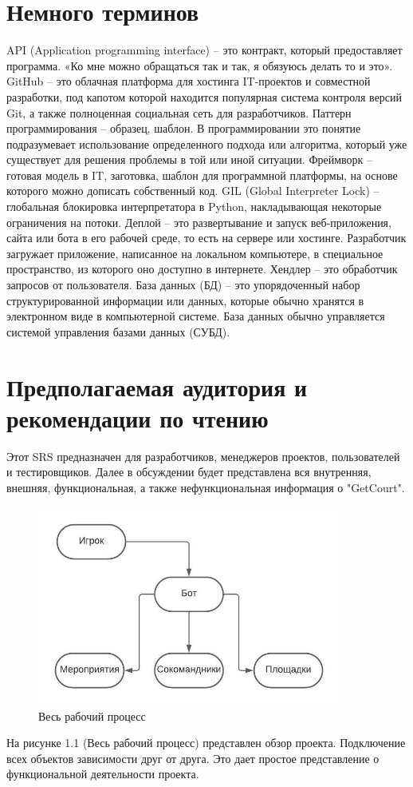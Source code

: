 \documentclass{scrreprt}
\begin{document}
\section{Немного терминов}
API (Application programming interface) – это контракт, который предоставляет программа. «Ко мне можно обращаться так и так, я обязуюсь делать то и это».
GitHub – это облачная платформа для хостинга IT-проектов и совместной разработки, под капотом которой находится популярная система контроля версий Git, а также полноценная социальная сеть для разработчиков.
Паттерн программирования – образец, шаблон. В программировании это понятие подразумевает использование определенного подхода или алгоритма, который уже существует для решения проблемы в той или иной ситуации.
Фреймворк – готовая модель в IT, заготовка, шаблон для программной платформы, на основе которого можно дописать собственный код.
GIL (Global Interpreter Lock) – глобальная блокировка интерпретатора в Python, накладывающая некоторые ограничения на потоки.
Деплой – это развертывание и запуск веб-приложения, сайта или бота в его рабочей среде, то есть на сервере или хостинге. Разработчик загружает приложение, написанное на локальном компьютере, в специальное пространство, из которого оно доступно в интернете.
Хендлер – это обработчик запросов от пользователя.
База данных (БД) – это упорядоченный набор структурированной информации или данных, которые обычно хранятся в электронном виде в компьютерной системе. База данных обычно управляется системой управления базами данных (СУБД).



\section{Предполагаемая аудитория и рекомендации по чтению}
Этот SRS предназначен для разработчиков, менеджеров проектов, пользователей и тестировщиков. Далее в обсуждении будет представлена вся внутренняя, внешняя, функциональная, а также нефункциональная информация о "GetCourt".
\newline
\begin{figure}
    \centering
    \includegraphics[width=10cm]{project scope.jpeg}
    \caption{Весь рабочий процесс}
    \label{fig:IICT WEBSITE}
\end{figure}
\newline
\newpage
На рисунке 1.1 (Весь рабочий процесс) представлен обзор проекта. Подключение всех объектов зависимости друг от друга. Это дает простое представление о функциональной деятельности проекта. 
\newline
\end{document}
